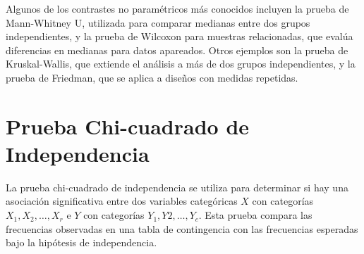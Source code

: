 \documentclass[
  letterpaper,
  DIV=11,
  numbers=noendperiod]{scrreprt}
\begin{document}
Algunos de los contrastes no paramétricos más conocidos incluyen la
prueba de Mann-Whitney U, utilizada para comparar medianas entre dos
grupos independientes, y la prueba de Wilcoxon para muestras
relacionadas, que evalúa diferencias en medianas para datos apareados.
Otros ejemplos son la prueba de Kruskal-Wallis, que extiende el análisis
a más de dos grupos independientes, y la prueba de Friedman, que se
aplica a diseños con medidas repetidas.

\hypertarget{prueba-chi-cuadrado-de-independencia}{%
\section{Prueba Chi-cuadrado de
Independencia}\label{prueba-chi-cuadrado-de-independencia}}

La prueba chi-cuadrado de independencia se utiliza para determinar si
hay una asociación significativa entre dos variables categóricas \(X\)
con categorías \(X_1,X_2,\ldots,X_r\) e \(Y\) con categorías
\(Y_1,Y2,\ldots,Y_c\). Esta prueba compara las frecuencias observadas en
una tabla de contingencia con las frecuencias esperadas bajo la
hipótesis de independencia.
\end{document}
